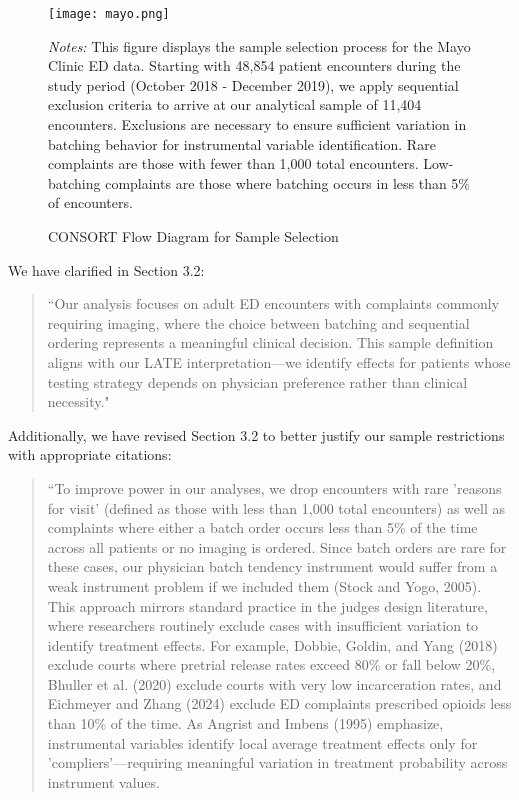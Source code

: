 \documentclass[11pt]{article}
\newcommand{\1}{\hbox{\rm 1\kern-.35em 1}}
\begin{document}
{{\begin{figure}[ht]
\centering
\begin{threeparttable}
\texttt{[image: mayo.png]}
    \caption{CONSORT Flow Diagram for Sample Selection}
    \label{fig:consort}
    \begin{tablenotes}
        \small
        \item \textit{Notes:} This figure displays the sample selection process for the Mayo Clinic ED data. Starting with 48,854 patient encounters during the study period (October 2018 - December 2019), we apply sequential exclusion criteria to arrive at our analytical sample of 11,404 encounters. Exclusions are necessary to ensure sufficient variation in batching behavior for instrumental variable identification. Rare complaints are those with fewer than 1,000 total encounters. Low-batching complaints are those where batching occurs in less than 5\% of encounters.
    \end{tablenotes}
\end{threeparttable}
\end{figure}


We have clarified in Section 3.2: 

\begin{quote}
    ``Our analysis focuses on adult ED encounters with complaints commonly requiring imaging, where the choice between batching and sequential ordering represents a meaningful clinical decision. This sample definition aligns with our LATE interpretation---we identify effects for patients whose testing strategy depends on physician preference rather than clinical necessity."
\end{quote}

Additionally, we have revised Section 3.2 to better justify our sample restrictions with appropriate citations:

\begin{quote}
``To improve power in our analyses, we drop encounters with rare 'reasons for visit' (defined as those with less than 1,000 total encounters) as well as complaints where either a batch order occurs less than 5\% of the time across all patients or no imaging is ordered. Since batch orders are rare for these cases, our physician batch tendency instrument would suffer from a weak instrument problem if we included them (Stock and Yogo, 2005). This approach mirrors standard practice in the judges design literature, where researchers routinely exclude cases with insufficient variation to identify treatment effects. For example, Dobbie, Goldin, and Yang (2018) exclude courts where pretrial release rates exceed 80\% or fall below 20\%, Bhuller et al. (2020) exclude courts with very low incarceration rates, and Eichmeyer and Zhang (2024) exclude ED complaints prescribed opioids less than 10\% of the time. As Angrist and Imbens (1995) emphasize, instrumental variables identify local average treatment effects only for 'compliers'—requiring meaningful variation in treatment probability across instrument values.


\end{quote}}}
\end{document}
